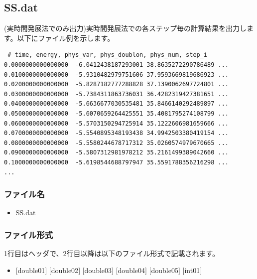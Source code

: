 \newpage
\subsection{{SS.dat}}
\label{Subsec:ssTE}
(実時間発展法でのみ出力)実時間発展法での各ステップ毎の計算結果を出力します。以下にファイル例を示します。\\

\begin{minipage}{15cm}
\begin{screen}
\begin{verbatim}
 # time, energy, phys_var, phys_doublon, phys_num, step_i
0.0000000000000000  -6.0412438187293001 38.8635272290786489 ...
0.0100000000000000  -5.9310482979751606 37.9593669819686923 ...
0.0200000000000000  -5.8287182777288828 37.1390062697724801 ...
0.0300000000000000  -5.7384311863736031 36.4282319427381651 ...
0.0400000000000000  -5.6636677030535481 35.8466140292489897 ...
0.0500000000000000  -5.6070659264425551 35.4081795274108799 ...
0.0600000000000000  -5.5703150294725914 35.1222606981659666 ...
0.0700000000000000  -5.5540895348193438 34.9942503380419154 ...
0.0800000000000000  -5.5580244678717312 35.0260574979670665 ...
0.0900000000000000  -5.5807312981978212 35.2161499389042660 ...
0.1000000000000000  -5.6198544688797947 35.5591788356216298 ...
...
\end{verbatim}
\end{screen}
\end{minipage}

\subsubsection{ファイル名}
 \begin{itemize}
   \item SS.dat
  \end{itemize}

\subsubsection{ファイル形式}
1行目はヘッダで、2行目以降は以下のファイル形式で記載されます。
 \begin{itemize}
   \item $[$double01$]$ $[$double02$]$ $[$double03$]$ $[$double04$]$ $[$double05$]$ $[$int01$]$
  \end{itemize}
